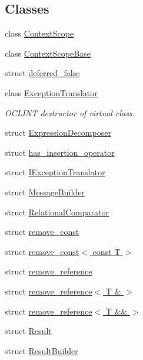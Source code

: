 \subsection*{Classes}
\begin{DoxyCompactItemize}
\item 
class \hyperlink{classdoctest_1_1detail_1_1ContextScope}{Context\+Scope}
\item 
class \hyperlink{classdoctest_1_1detail_1_1ContextScopeBase}{Context\+Scope\+Base}
\item 
struct \hyperlink{structdoctest_1_1detail_1_1deferred__false}{deferred\+\_\+false}
\item 
class \hyperlink{classdoctest_1_1detail_1_1ExceptionTranslator}{Exception\+Translator}
\begin{DoxyCompactList}\small\item\em O\+C\+L\+I\+NT destructor of virtual class. \end{DoxyCompactList}\item 
struct \hyperlink{structdoctest_1_1detail_1_1ExpressionDecomposer}{Expression\+Decomposer}
\item 
struct \hyperlink{structdoctest_1_1detail_1_1has__insertion__operator}{has\+\_\+insertion\+\_\+operator}
\item 
struct \hyperlink{structdoctest_1_1detail_1_1IExceptionTranslator}{I\+Exception\+Translator}
\item 
struct \hyperlink{structdoctest_1_1detail_1_1MessageBuilder}{Message\+Builder}
\item 
struct \hyperlink{structdoctest_1_1detail_1_1RelationalComparator}{Relational\+Comparator}
\item 
struct \hyperlink{structdoctest_1_1detail_1_1remove__const}{remove\+\_\+const}
\item 
struct \hyperlink{structdoctest_1_1detail_1_1remove__const_3_01const_01T_01_4}{remove\+\_\+const$<$ const T $>$}
\item 
struct \hyperlink{structdoctest_1_1detail_1_1remove__reference}{remove\+\_\+reference}
\item 
struct \hyperlink{structdoctest_1_1detail_1_1remove__reference_3_01T_01_6_01_4}{remove\+\_\+reference$<$ T \& $>$}
\item 
struct \hyperlink{structdoctest_1_1detail_1_1remove__reference_3_01T_01_6_6_01_4}{remove\+\_\+reference$<$ T \&\& $>$}
\item 
struct \hyperlink{structdoctest_1_1detail_1_1Result}{Result}
\item 
struct \hyperlink{structdoctest_1_1detail_1_1ResultBuilder}{Result\+Builder}

\end{DoxyCompactItemize}
